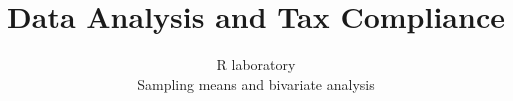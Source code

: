 \documentclass[aspectratio=169,11pt]{beamer}
\title{Data Analysis and Tax Compliance}
\subtitle{R laboratory\\Sampling means and bivariate analysis}
\date{}
\begin{document}
\begin{frame}[plain]\titlepage\end{frame}

\end{document}
